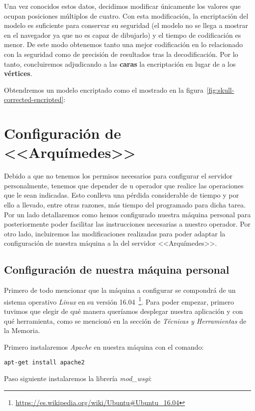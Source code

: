 Una vez conocidos estos datos, decidimos modificar únicamente los valores que ocupan posiciones múltiplos de cuatro. Con esta modificación, la encriptación del modelo es suficiente para conservar su seguridad (el modelo no se llega a mostrar en el navegador ya que no es capaz de dibujarlo) y el tiempo de codificación es menor. De este modo obtenemos tanto una mejor codificación en lo relacionado con la seguridad como de precisión de resultados tras la decodificación. Por lo tanto, concluiremos adjudicando a las \textbf{caras} la encriptación en lugar de a los \textbf{vértices}.

Obtendremos un modelo encriptado como el mostrado en la figura~\ref{fig:skull-corrected-encripted}:

\section{Configuración de  <<Arquímedes>>}\label{sec:arquimedes-conf}
Debido a que no tenemos los permisos necesarios para configurar el servidor personalmente, tenemos que depender de u operador que realice las operaciones que le sean indicadas. Esto conlleva una pérdida considerable de tiempo y por ello a llevado, entre otras razones, más tiempo del programado para dicha tarea. Por un lado detallaremos como hemos configurado nuestra máquina personal para posteriormente poder facilitar las instrucciones necesarias a nuestro operador. Por otro lado, incluiremos las modificaciones realizadas para poder adaptar la configuración de nuestra máquina a la del servidor <<Arquímedes>>.

\subsection{Configuración de nuestra máquina personal}
Primero de todo mencionar que la máquina a configurar se compondrá de un sistema operativo \textit{Linux} en su versión 16.04~\footnote{\url{https://es.wikipedia.org/wiki/Ubuntu\#Ubuntu\_16.04}}. Para poder empezar, primero tuvimos que elegir de qué manera queríamos desplegar nuestra aplicación y con qué herramienta, como se mencionó en la sección de \textit{Técnicas y Herramientas} de la Memoria.

Primero instalaremos \textit{Apache} en nuestra máquina con el comando:

\noindent\verb|apt-get install apache2|

Paso siguiente instalaremos la librería \textit{mod\_wsgi}:

